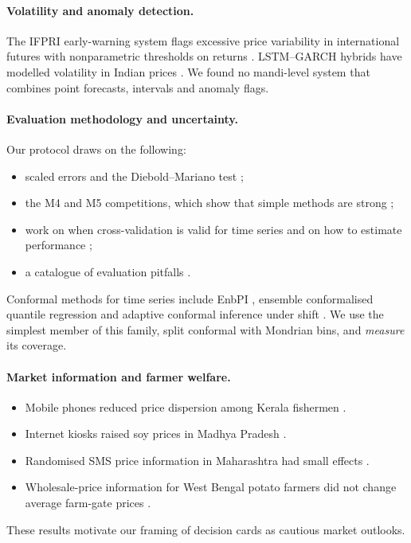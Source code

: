 \paragraph{Volatility and anomaly detection.}
The IFPRI early-warning system flags excessive price variability in international futures with nonparametric thresholds on returns \cite{geng2021earlywarning}.
LSTM--GARCH hybrids have modelled volatility in Indian prices \cite{manogna2025volatility}.
We found no mandi-level system that combines point forecasts, intervals and anomaly flags.

\paragraph{Evaluation methodology and uncertainty.}
Our protocol draws on the following:
\begin{itemize}
  \item scaled errors \cite{hyndman2006another} and the Diebold--Mariano test \cite{diebold1995comparing};
  \item the M4 and M5 competitions, which show that simple methods are strong \cite{makridakis2020m4,makridakis2022m5};
  \item work on when cross-validation is valid for time series and on how to estimate performance \cite{bergmeir2018note,cerqueira2020evaluating};
  \item a catalogue of evaluation pitfalls \cite{hewamalage2022pitfalls}.
\end{itemize}
Conformal methods for time series include EnbPI \cite{xu2023conformal}, ensemble conformalised quantile regression \cite{jensen2024encqr} and adaptive conformal inference under shift \cite{gibbs2021adaptive}.
We use the simplest member of this family, split conformal with Mondrian bins, and \emph{measure} its coverage.

\paragraph{Market information and farmer welfare.}
\begin{itemize}
  \item Mobile phones reduced price dispersion among Kerala fishermen \cite{jensen2007digital}.
  \item Internet kiosks raised soy prices in Madhya Pradesh \cite{goyal2010information}.
  \item Randomised SMS price information in Maharashtra had small effects \cite{fafchamps2012sms}.
  \item Wholesale-price information for West Bengal potato farmers did not change average farm-gate prices \cite{mitra2018asymmetric}.
\end{itemize}
These results motivate our framing of decision cards as cautious market outlooks.

